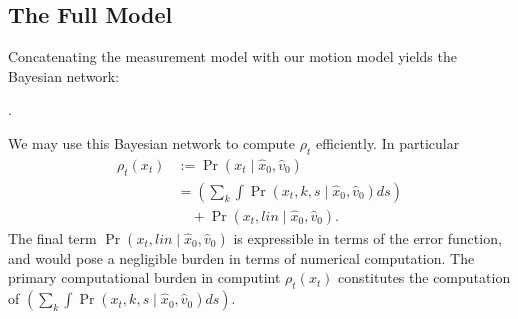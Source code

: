 \documentclass[conference]{IEEEtran}
\begin{document}
\subsection{The Full Model}
Concatenating the measurement model with our motion model yields the Bayesian network:
\begin{center}
.
\end{center}
We may use this Bayesian network to compute $\rho_t$ efficiently.
In particular
\begin{align*}
	\rho_t(x_t ) &:= \Pr( x_t \mid \hat{x}_0, \hat{v}_0 ) \\
	&= \left( \sum_{k} \int \Pr( x_t, k , s  \mid \hat{x}_0, \hat{v}_0 ) ds \right) \\
	&\quad + \Pr( x_t, lin \mid \hat{x}_0, \hat{v}_0 ).
\end{align*}
The final term $\Pr( x_t, lin \mid \hat{x}_0, \hat{v}_0 )$ is expressible in terms of the error function, and would pose a negligible burden in terms of numerical computation.
The primary computational burden in computint $\rho_t(x_t)$ constitutes the computation of $\left( \sum_{k} \int \Pr( x_t, k , s  \mid \hat{x}_0, \hat{v}_0 ) ds \right)$.
\end{document}

